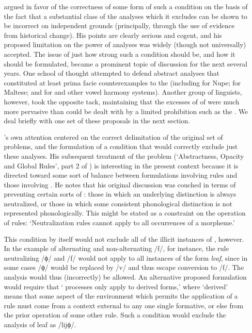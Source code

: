{\Kiparsky} argued in favor of the correctness of some form of such a
condition on the basis of the fact that a substantial class of the
analyses which it excludes can be shown to be incorrect on independent
grounds (principally, through the use of evidence from historical
change). His points are clearly serious and cogent, and his proposed
limitation on the power of analyses was widely (though not
universally) accepted. The issue of just how strong such a condition
should be, and how it should be formulated, became a prominent topic
of discussion for the next several years. One school of thought
attempted to defend abstract analyses that constituted at least prima
facie counterexamples to the  (including
\citet{hyman70:concreteness} for Nupe; \citet{brame72:maltese} for
Maltese; and \citet{vago73:abstract.vh} for  and other vowel
harmony systems). Another group of linguists, however, took the
opposite tack, maintaining that the excesses of  of
\textsl{} were much more pervasive than could be dealt with by a
limited prohibition such as the . We deal briefly
with one set of these proposals in the next section.

{\Kiparsky}'s own attention centered on the correct delimitation of the
original set of problems, and the formulation of a condition that
would correctly exclude just these analyses. His subsequent treatment
of the problem (`Abstractness, Opacity and Global Rules', part 2 of
\citealt{kiparsky:3dimensions}) is interesting in the present context
because it is directed toward some sort of balance between
formulations involving rules and those involving . He
notes that his original discussion was couched in terms of preventing
certain sorts of : those in which an underlying
distinction is always neutralized, or those in which some consistent
phonological distinction is not represented phonologically. This might
be stated as a constraint on the operation of rules: `Neutralization
rules cannot apply to all occurrences of a morpheme.'

This condition by itself would not exclude all of the illicit
instances of , however. In the example of
 alternating and non-alternating /f/, for instance, the rule
neutralizing /ϕ/ and /f/ would not apply to all instances of the
form \textit{leaf}, since in some cases /ϕ/ would be replaced by /v/ and
thus escape conversion to /f/. The analysis would thus (incorrectly)
be allowed. An alternative proposed formulation would require that
` processes only apply to derived forms,' where
`derived' means that some aspect of the environment which permits the
application of a rule must come from a context external to any one
single formative, or else from the prior operation of some other
rule. Such a condition would exclude the analysis of leaf as /lijϕ/.

